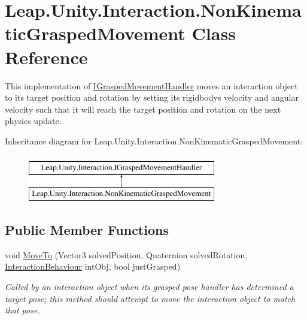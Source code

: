 \hypertarget{class_leap_1_1_unity_1_1_interaction_1_1_non_kinematic_grasped_movement}{}\section{Leap.\+Unity.\+Interaction.\+Non\+Kinematic\+Grasped\+Movement Class Reference}
\label{class_leap_1_1_unity_1_1_interaction_1_1_non_kinematic_grasped_movement}


This implementation of \mbox{\hyperlink{interface_leap_1_1_unity_1_1_interaction_1_1_i_grasped_movement_handler}{I\+Grasped\+Movement\+Handler}} moves an interaction object to its target position and rotation by setting its rigidbody\textquotesingle{}s velocity and angular velocity such that it will reach the target position and rotation on the next physics update.  


Inheritance diagram for Leap.\+Unity.\+Interaction.\+Non\+Kinematic\+Grasped\+Movement\+:\begin{figure}[H]
\begin{center}
\leavevmode
\includegraphics[height=2.000000cm]{class_leap_1_1_unity_1_1_interaction_1_1_non_kinematic_grasped_movement}
\end{center}
\end{figure}
\subsection*{Public Member Functions}
\begin{DoxyCompactItemize}
\item 
void \mbox{\hyperlink{class_leap_1_1_unity_1_1_interaction_1_1_non_kinematic_grasped_movement_a08d130dc9eb2ddc98347725867b2f6de}{Move\+To}} (Vector3 solved\+Position, Quaternion solved\+Rotation, \mbox{\hyperlink{class_leap_1_1_unity_1_1_interaction_1_1_interaction_behaviour}{Interaction\+Behaviour}} int\+Obj, bool just\+Grasped)
\begin{DoxyCompactList}\small\item\em Called by an interaction object when its grasped pose handler has determined a target pose; this method should attempt to move the interaction object to match that pose. \end{DoxyCompactList}\end{DoxyCompactItemize}
